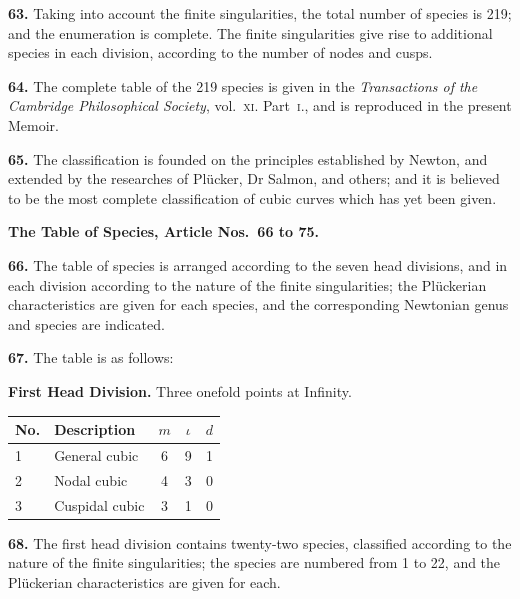 \documentclass[11pt,a4paper]{article}
\theoremstyle{plain}
\theoremstyle{definition}
\begin{document}
\textbf{63.} Taking into account the finite singularities, the total number of species is 219; and the enumeration is complete. The finite singularities give rise to additional species in each division, according to the number of nodes and cusps.

\textbf{64.} The complete table of the 219 species is given in the \textit{Transactions of the Cambridge Philosophical Society}, vol.~\textsc{xi}. Part~\textsc{i}., and is reproduced in the present Memoir.

\textbf{65.} The classification is founded on the principles established by Newton, and extended by the researches of Pl\"{u}cker, Dr Salmon, and others; and it is believed to be the most complete classification of cubic curves which has yet been given.

\bigskip

\noindent\textbf{The Table of Species, Article Nos.~66 to 75.}

\medskip

\textbf{66.} The table of species is arranged according to the seven head divisions, and in each division according to the nature of the finite singularities; the Pl\"{u}ckerian characteristics are given for each species, and the corresponding Newtonian genus and species are indicated.

\textbf{67.} The table is as follows:

\begin{center}
\small
\textbf{First Head Division.} Three onefold points at Infinity. \\
\medskip
\begin{tabular}{@{}llccc@{}}
\toprule
\textbf{No.} & \textbf{Description} & $m$ & $\iota$ & $d$ \\
\midrule
1 & General cubic & 6 & 9 & 1 \\
2 & Nodal cubic & 4 & 3 & 0 \\
3 & Cuspidal cubic & 3 & 1 & 0 \\
\bottomrule
\end{tabular}
\end{center}

\textbf{68.} The first head division contains twenty-two species, classified according to the nature of the finite singularities; the species are numbered from 1 to 22, and the Pl\"{u}ckerian characteristics are given for each.
\end{document}
